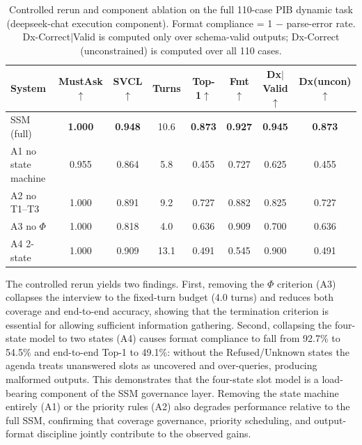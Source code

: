 \documentclass[conference]{IEEEtran}
\begin{document}
\begin{table}[htbp]
\caption{Controlled rerun and component ablation on the full 110-case PIB dynamic task (deepseek-chat execution component). Format compliance = 1 $-$ parse-error rate. Dx-Correct$|$Valid is computed only over schema-valid outputs; Dx-Correct (unconstrained) is computed over all 110 cases.}
\label{tab:ablation}
\begin{center}
\begin{tabular}{lccccccc}
\toprule
\textbf{System} & \textbf{MustAsk$\uparrow$} & \textbf{SVCL$\uparrow$} & \textbf{Turns} & \textbf{Top-1$\uparrow$} & \textbf{Fmt$\uparrow$} & \textbf{Dx$|$Valid$\uparrow$} & \textbf{Dx(uncon)$\uparrow$} \\
\midrule
\rowcolor[gray]{0.88}
SSM (full)            & \textbf{1.000} & \textbf{0.948} & 10.6 & \textbf{0.873} & \textbf{0.927} & \textbf{0.945} & \textbf{0.873} \\
A1 no state machine   & 0.955 & 0.864 & 5.8  & 0.455 & 0.727 & 0.625 & 0.455 \\
A2 no T1--T3          & 1.000 & 0.891 & 9.2  & 0.727 & 0.882 & 0.825 & 0.727 \\
A3 no $\Phi$          & 1.000 & 0.818 & 4.0  & 0.636 & 0.909 & 0.700 & 0.636 \\
A4 2-state            & 1.000 & 0.909 & 13.1 & 0.491 & 0.545 & 0.900 & 0.491 \\
\bottomrule
\end{tabular}
\end{center}
\end{table}

The controlled rerun yields two findings. First, removing the $\Phi$ criterion (A3) collapses the interview to the fixed-turn budget (4.0 turns) and reduces both coverage and end-to-end accuracy, showing that the termination criterion is essential for allowing sufficient information gathering. Second, collapsing the four-state model to two states (A4) causes format compliance to fall from 92.7\% to 54.5\% and end-to-end Top-1 to 49.1\%: without the Refused/Unknown states the agenda treats unanswered slots as uncovered and over-queries, producing malformed outputs. This demonstrates that the four-state slot model is a load-bearing component of the SSM governance layer. Removing the state machine entirely (A1) or the priority rules (A2) also degrades performance relative to the full SSM, confirming that coverage governance, priority scheduling, and output-format discipline jointly contribute to the observed gains.
\end{document}
